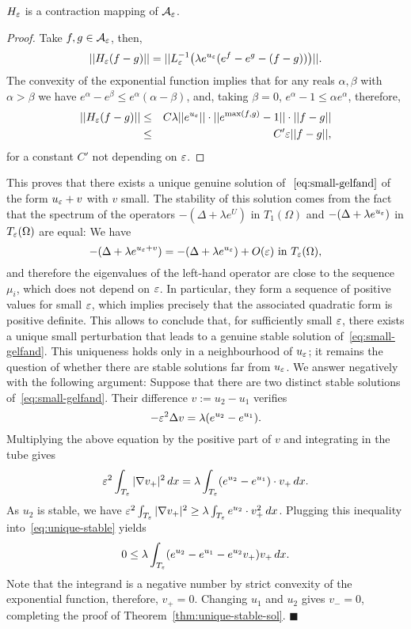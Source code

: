 \begin{lemma}
    $H_\varepsilon$ is a contraction mapping of $\mathcal{A}_\varepsilon$.
\end{lemma}
\begin{proof}
    Take $f,g\in \mathcal{A}_\varepsilon$, then,
    \[
        ||H_\varepsilon(f-g)||=||L_\varepsilon^{-1}\big(\lambda e^{u_\varepsilon}(e^f-e^g -
        (f-g))\big)||.
    \]
    The convexity of the exponential function implies that for any reals
    $\alpha,\beta$ with $\alpha>\beta$ we have $e^{\alpha}-e^{\beta}\leq
    e^{\alpha}(\alpha-\beta)$, and, taking $\beta=0$, $e^\alpha-1\leq \alpha e^\alpha$, therefore,
    \begin{eqnarray*}
        ||H_\varepsilon(f-g)||&\leq& C\lambda ||e^{u_\varepsilon}||\cdot ||e^{\max(f,g)}-1||\cdot
        ||f-g||\\
                      &\leq& C'\varepsilon||f-g||,
    \end{eqnarray*}
    for a constant $C'$ not depending on $\varepsilon$.
\end{proof}
This proves that there exists a
unique genuine solution of $~\ref{eq:small-gelfand}$ of the form $u_\varepsilon+v$
with $v$ small. The stability of this solution comes from the fact that the
spectrum of the operators $-(\Delta+\lambda e^U)$ in $T_1(\Omega)$ and
$-(\Delta + \lambda e^{u_\varepsilon})$ in $T_\varepsilon(\Omega)$ are equal: We have
\[
-(\Delta + \lambda e^{u_\varepsilon+v})=-(\Delta + \lambda e^{u_\varepsilon})+O(\varepsilon)
\mbox{ in } T_\varepsilon(\Omega),
\]
and therefore the eigenvalues of the left-hand operator are close to the
sequence $\mu_i$, which does not depend on $\varepsilon$. In particular, they form
a sequence of positive values for small $\varepsilon$, which implies precisely that
the associated quadratic form is positive definite. This allows to conclude
that, for sufficiently small $\varepsilon$, there exists a unique small perturbation
that leads to a genuine stable solution of~\ref{eq:small-gelfand}. This
uniqueness holds only in a neighbourhood of $u_\varepsilon$; it remains the
question of whether there are stable solutions far from $u_\varepsilon$. We answer
negatively with the following argument: Suppose that there are two distinct
stable solutions of~\ref{eq:small-gelfand}. Their difference $v:=u_2-u_1$
verifies
\[
-\varepsilon^2 \Delta v = \lambda(e^{u_2}-e^{u_1}).
\]
Multiplying the above equation by the positive part of $v$ and integrating
in the tube gives
\begin{equation}
    \label{eq:unique-stable}
    \varepsilon^2\int_{T_\varepsilon}|\nabla v_+|^2\,dx = \lambda
    \int_{T_\varepsilon}(e^{u_2}-e^{u_1})\cdot v_+\, dx.
\end{equation}
As $u_2$ is stable, we have $\varepsilon^2\int_{T_\varepsilon}|\nabla v_+|^2\geq \lambda
\int_{T_\varepsilon} e^{u_2}\cdot v_+^2\, dx$. Plugging this inequality
into~\ref{eq:unique-stable} yields
\[
0 \leq \lambda \int_{T_\varepsilon}(e^{u_2}-e^{u_1}-e^{u_2}v_+)v_+\, dx.
\]
Note that the integrand is a negative number by strict convexity of the
exponential function, therefore, $v_+=0$. Changing $u_1$ and $u_2$ gives
$v_-=0$, completing the proof of Theorem~\ref{thm:unique-stable-sol}.
\hfill $\blacksquare$
